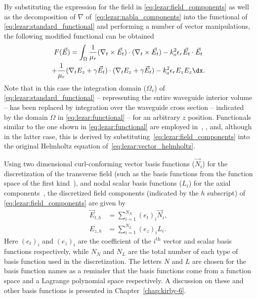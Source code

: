 By substituting the expression for the field in
\eqref{eq:lezar:field_components} as well as the decomposition of
$\nabla$ of~\eqref{eq:lezar:nabla_components} into the functional of
\eqref{eq:lezar:standard_functional} and performing a number of vector
manipulations, the following modified functional can be obtained
\begin{multline}
    \label{eq:lezar:functional}
    F(\vec{E}) = \int_{\Omega}\frac{1}{\mu_r}(\nabla_t\times{\vec{E}_t})\cdot(\nabla_t\times{\vec{E}_t})
    - k_o^2\epsilon_r\vec{E}_t\cdot{\vec{E}_t}\\
    +\frac{1}{\mu_r}(\nabla_t{E_z} + \gamma\vec{E}_t)\cdot(\nabla_t{E_z} + \gamma\vec{E}_t)
    -k_o^2\epsilon_r E_z{E_z} \dx.
\end{multline}
Note that in this case the integration domain ($\Omega_v$) of
\eqref{eq:lezar:standard_functional} -- representing the entire
waveguide interior volume -- has been replaced by integration over
the waveguide cross section -- indicated by the domain $\Omega$ in
\eqref{eq:lezar:functional} -- for an arbitrary $z$ position. Functionals
similar to the one shown in \eqref{eq:lezar:functional}
are employed in~\citet{LeeSunCendes1991}, \citet{Jin2002},
and\citet{PelosiCoccioliSelleri1998}, although in the latter case,
this is derived by substituting~\eqref{eq:lezar:field_components} into
the original Helmholtz equation of~\eqref{eq:lezar:vector_helmholtz}.

Using two dimensional curl-conforming vector basis functions
($\vec{N}_i$) for the discretization of the transverse field (such as
the basis functions from the \nedelec{} function space of the first
kind~\citep{Nedelec1980, Webb1993, Monk2003}), and nodal scalar basis
functions ($L_i$) for the axial components~\citep{Jin2002,
PelosiCoccioliSelleri1998}, the discretized field components
(indicated by the $h$ subscript) of \eqref{eq:lezar:field_components}
are given by~\citep{Jin2002, PelosiCoccioliSelleri1998}
\begin{align}
  \label{eq:lezar:E_t_discretized}
  \vec{E}_{t,h} &= \sum_{i=1}^{N_N} (e_t)_i \vec{N}_i,\\
  \label{eq:lezar:E_z_discretized}
  E_{z,h} &= \sum_{i=1}^{N_L} (e_z)_i L_i.
\end{align}
Here $(e_t)_i$ and $(e_z)_i$ are the coefficient of the $i^\text{th}$
vector and scalar basis functions respectively, while $N_N$ and $N_L$
are the total number of each type of basis function used in the
discretization. The letters $N$ and $L$ are chosen for the basis
function names as a reminder that the basis functions come from
a \nedelec{} function space and a Lagrange polynomial space
respectively. A discussion on these and other basis functions is
presented in Chapter~\ref{chap:kirby-6}.

